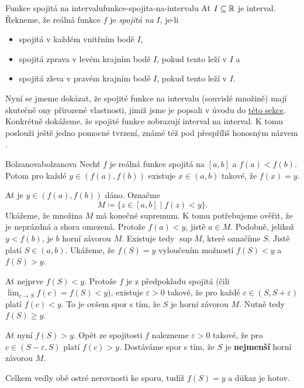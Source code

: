 \begin{definition}{Funkce spojitá na intervalu}{funkce-spojita-na-intervalu}
 Ať $I \subseteq \mathbb{R}$ je interval. Řekneme, že reálná funkce $f$ je
 \emph{spojitá na} $I$, je-li
 \begin{itemize}
  \item spojitá v každém vnitřním bodě $I$,
  \item spojitá zprava v levém krajním bodě $I$, pokud tento leží v $I$ a
  \item spojitá zleva v pravém krajním bodě $I$, pokud tento leží v $I$.
 \end{itemize}
\end{definition}

Nyní se jmeme dokázat, že spojité funkce na intervalu (souvislé množině) mají
skutečně ony přirozené vlastnosti, jimiž jsme je popsali v úvodu do
\hyperref[sec:spojite-funkce]{této sekce}. Konkrétně dokážeme, že spojité funkce
zobrazují interval na interval. K tomu poslouží ještě jedno pomocné tvrzení,
známé též pod přespříliš honosným názvem .

\begin{theorem}{Bolzanova}{bolzanova}
 Nechť $f$ je reálná funkce spojitá na $[a,b]$ a $f(a) < f(b)$. Potom pro každé
 $y \in (f(a),f(b))$ existuje $x \in (a,b)$ takové, že $f(x) = y$.
\end{theorem}
\begin{thmproof}
 Ať je $y \in (f(a),f(b))$ dáno. Označme
 \[
  M \coloneqq \{z \in [a,b] \mid f(z) < y\}.
 \]
 Ukážeme, že množina $M$ má konečné supremum. K tomu potřebujeme ověřit, že je
 neprázdná a shora omezená. Protože $f(a) < y$, jistě $a \in M$. Podobně,
 jelikož $y < f(b)$, je $b$ horní závorou $M$. Existuje tedy $\sup M$, které
 označíme $S$. Jistě platí $S \in (a,b)$. Ukážeme, že $f(S) = y$ vyloučením
 možností $f(S) < y$ a $f(S) > y$.

 Ať nejprve $f(S) < y$. Protože $f$ je z předpokladu spojitá (čili $\lim_{c \to
 S} f(c) = f(S) < y$), existuje $\varepsilon>0$ takové, že pro každé $c \in
 (S,S+\varepsilon)$ platí $f(c) < y$. To je ovšem spor s tím, že $S$ je horní
 závorou $M$. Nutně tedy $f(S) \geq y$.

 Ať nyní $f(S) > y$. Opět ze spojitosti $f$ nalezneme $\varepsilon>0$ takové, že
 pro $c \in (S-\varepsilon,S)$ platí $f(c) > y$. Dostáváme spor s tím, že $S$ je
 \textbf{nejmenší} horní závorou $M$.

 Celkem vedly obě ostré nerovnosti ke sporu, tudíž $f(S) = y$ a důkaz je hotov.
\end{thmproof}

